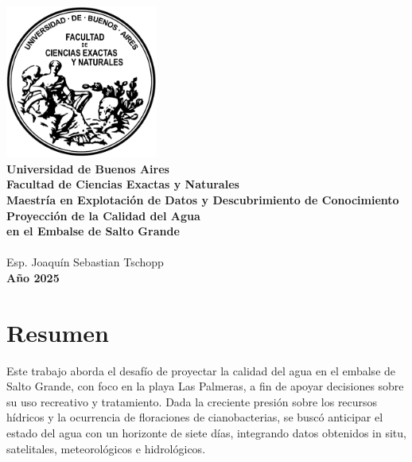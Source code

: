 \documentclass[11pt]{report}
\begin{document}
\begin{titlepage}
    \begin{center}
        \includegraphics[width=5cm]{Imagenes/Escudo_UBA.png}\\[1cm]

        {\Large \textbf{Universidad de Buenos Aires}}\\[0.2cm]
        \textbf{Facultad de Ciencias Exactas y Naturales}\\[0.2cm]
        \textbf{Maestría en Explotación de Datos y Descubrimiento de Conocimiento}\\[3cm]

        {\Huge \textbf{Proyección de la Calidad del Agua\\
        en el Embalse de Salto Grande}}\\[6cm]

        \textbf\\
        Esp. Joaquín Sebastian Tschopp\\[0.5cm]

        {\normalsize \textbf{Año 2025}}
    \end{center}
\end{titlepage}



\tableofcontents %



\newpage

\section*{Resumen}
Este trabajo aborda el desafío de proyectar la calidad del agua en el embalse de Salto Grande, con foco en la playa Las Palmeras, a fin de apoyar decisiones sobre su uso recreativo y tratamiento. Dada la creciente presión sobre los recursos hídricos y la ocurrencia de floraciones de cianobacterias, se buscó anticipar el estado del agua con un horizonte de siete días, integrando datos obtenidos in situ, satelitales, meteorológicos e hidrológicos.
\end{document}
